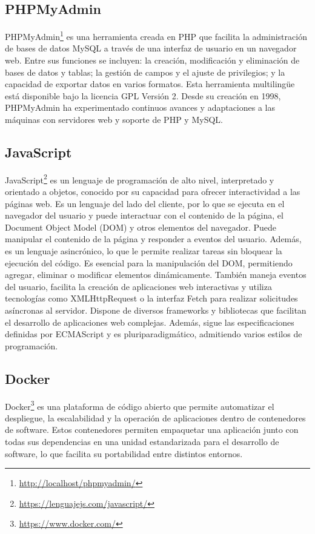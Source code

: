 \documentclass[a4paper, 12pt]{book}
\begin{document}
\subsection{PHPMyAdmin}
\label{subsec:phpmyadmin} 
PHPMyAdmin\footnote{\url{http://localhost/phpmyadmin/}} es una herramienta creada en PHP que facilita la administración de bases de datos 
MySQL a través de una interfaz de usuario en un navegador web. 
Entre sus funciones se incluyen:\cite{phpmyadmin} la creación, modificación y eliminación de bases de datos y tablas; la gestión de campos y el ajuste de privilegios; y la 
capacidad de exportar datos en varios formatos. Esta herramienta multilingüe está disponible bajo la licencia GPL Versión 2. Desde su creación en 1998, 
PHPMyAdmin ha experimentado continuos avances y adaptaciones a las máquinas con servidores web y soporte de PHP y MySQL.

\subsection{JavaScript}
\label{subsec:JavaScript} 
JavaScript\footnote{\url{https://lenguajejs.com/javascript/}} es un lenguaje de programación de alto nivel, interpretado y orientado a objetos, conocido por su capacidad para ofrecer 
interactividad a las páginas web. Es un lenguaje del lado del cliente, por lo que se ejecuta en el navegador del usuario y puede interactuar con el contenido 
de la página, el Document Object Model (DOM) y otros elementos del navegador. Puede manipular el contenido de la página y responder a eventos del usuario. 
Además, es un lenguaje asincrónico, lo que le permite realizar tareas sin bloquear la ejecución del código. Es esencial para la manipulación del DOM, permitiendo 
agregar, eliminar o modificar elementos dinámicamente. También maneja eventos del usuario, facilita la creación de aplicaciones web interactivas y utiliza 
tecnologías como XMLHttpRequest o la interfaz Fetch para realizar solicitudes asíncronas al servidor. Dispone de diversos frameworks y bibliotecas que facilitan 
el desarrollo de aplicaciones web complejas. Además, sigue las especificaciones definidas por ECMAScript y es pluriparadigmático, admitiendo varios estilos de 
programación.

\subsection{Docker}
\label{subsec:Docker}
Docker\footnote{\url{https://www.docker.com/}} es una plataforma de código abierto que permite automatizar el despliegue, la escalabilidad y la operación de 
aplicaciones dentro de contenedores de software. Estos contenedores permiten empaquetar una aplicación junto con todas sus dependencias en una unidad estandarizada 
para el desarrollo de software, lo que facilita su portabilidad entre distintos entornos.
\end{document}
